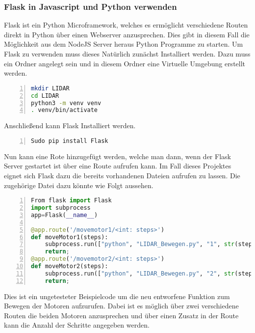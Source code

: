 \subsubsection{Flask in Javascript und Python verwenden}
Flask ist ein Python Microframework, welches es ermöglicht verschiedene Routen direkt in Python über einen Webserver anzusprechen. Dies gibt in diesem Fall die Möglichkeit aus dem NodeJS Server heraus Python Programme zu starten. 
Um Flask zu verwenden muss dieses Natürlich zunächst Installiert werden. Dazu muss ein Ordner angelegt sein und in diesem Ordner eine Virtuelle Umgebung erstellt werden. 
\begin{lstlisting}[caption={Installation Flask Schritt 1}, language={bash}, numbers=left]
mkdir LIDAR
cd LIDAR
python3 -m venv venv
. venv/bin/activate
\end{lstlisting}
Anschließend kann Flask Installiert werden.
\begin{lstlisting}[caption={Installation Flask Schritt 2}, language={bash}, numbers=left]
Sudo pip install Flask
\end{lstlisting}
Nun kann eine Rote hinzugefügt werden, welche man dann, wenn der Flask Server gestartet ist über eine Route aufrufen kann. 
Im Fall dieses Projektes eignet sich Flask dazu die bereits vorhandenen Dateien aufrufen zu lassen. Die zugehörige Datei dazu könnte wie Folgt aussehen.
\begin{lstlisting}[caption={Flask Beispielprogram}, language={python}, numbers=left]
From flask import Flask
import subprocess
app=Flask(__name__)

@app.route('/movemotor1/<int: steps>')
def moveMotor1(steps):
	subprocess.run(["python", "LIDAR_Bewegen.py", "1", str(steps)])
	return;
@app.route('/movemotor2/<int: steps>')
def moveMotor2(steps):
	subprocess.run(["python", "LIDAR_Bewegen.py", "2", str(steps)])
	return;

\end{lstlisting}
Dies ist ein ungetesteter Beispielcode um die neu entworfene Funktion zum Bewegen der Motoren aufzurufen. Dabei ist es möglich über zwei verschiedene Routen die beiden Motoren anzusprechen und über einen Zusatz in der Route kann die Anzahl der Schritte angegeben werden. \cite{flask}



